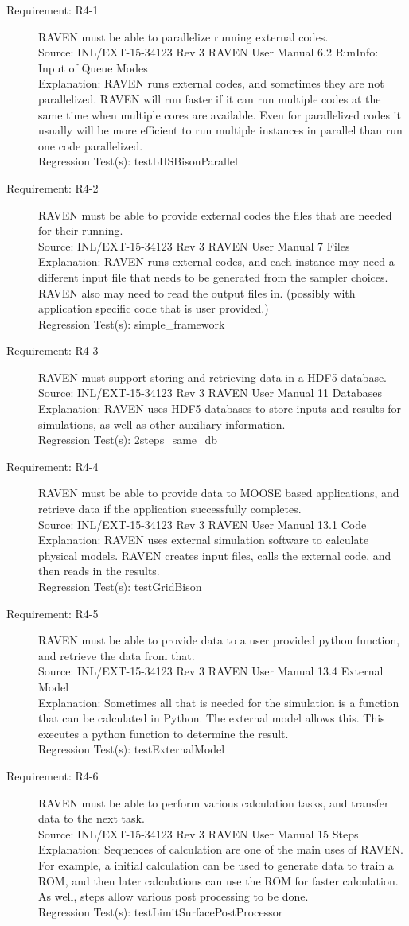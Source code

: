 \documentclass{article}
\newcommand{\requirement}[5]{\item[Requirement: #1] #2 \\Source: #3\\Explanation: #4\\Regression Test(s): #5}
\begin{document}
\begin{description}
\requirement{R4-1}{RAVEN must be able to parallelize running external codes.}
{INL/EXT-15-34123 Rev 3 RAVEN User Manual 6.2 RunInfo: Input of Queue Modes}
{RAVEN runs external codes, and sometimes they are not parallelized.  RAVEN will run faster if it can run multiple codes at the same time when multiple cores are available.  Even for parallelized codes it usually will be more efficient to run multiple instances in parallel than run one code parallelized.}
{testLHSBisonParallel}

\requirement{R4-2}{RAVEN must be able to provide external codes the files that are needed for their running.}
{INL/EXT-15-34123 Rev 3 RAVEN User Manual 7 Files}
{RAVEN runs external codes, and each instance may need a different input file that needs to be generated from the sampler choices.  RAVEN also may need to read the output files in. (possibly with application specific code that is user provided.)}
{simple\_framework}

\requirement{R4-3}{RAVEN must support storing and retrieving data in a HDF5 database.}
{INL/EXT-15-34123 Rev 3 RAVEN User Manual 11 Databases}
{RAVEN uses HDF5 databases to store inputs and results for simulations, as well as other auxiliary information.}
{2steps\_same\_db}

\requirement{R4-4}{RAVEN must be able to provide data to MOOSE based applications, and retrieve data if the application successfully completes.}
{INL/EXT-15-34123 Rev 3 RAVEN User Manual 13.1 Code}
{RAVEN uses external simulation software to calculate physical models.  RAVEN creates input files, calls the external code, and then reads in the results.}
{testGridBison}

\requirement{R4-5}{RAVEN must be able to provide data to a user provided python function, and retrieve the data from that.}
{INL/EXT-15-34123 Rev 3 RAVEN User Manual 13.4 External Model}
{Sometimes all that is needed for the simulation is a function that can be calculated in Python.  The external model allows this.  This executes a python function to determine the result.}
{testExternalModel}

\requirement{R4-6}{RAVEN must be able to perform various calculation tasks, and transfer data to the next task.}
{INL/EXT-15-34123 Rev 3 RAVEN User Manual 15 Steps}
{Sequences of calculation are one of the main uses of RAVEN.  For example, a initial calculation can be used to generate data to train a ROM, and then later calculations can use the ROM for faster calculation.  As well, steps allow various post processing to be done.}
{testLimitSurfacePostProcessor}


\end{description}
\end{document}
